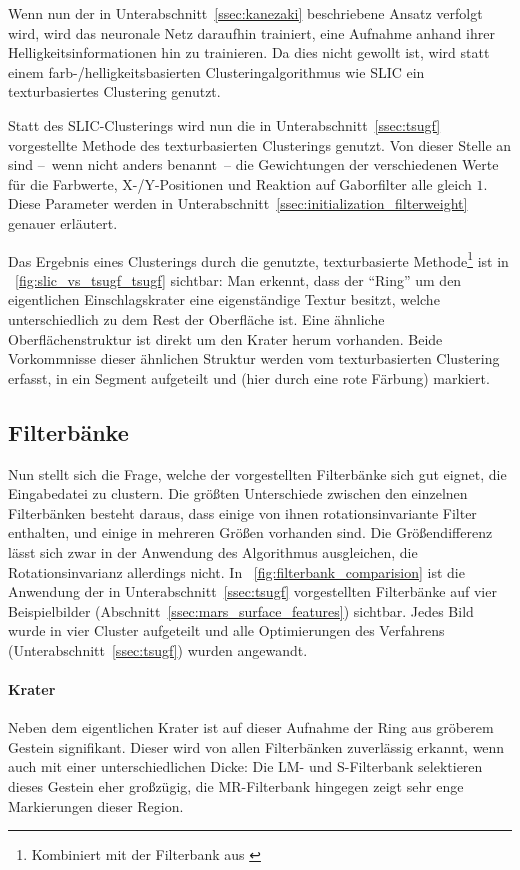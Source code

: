 Wenn nun der in Unterabschnitt~\ref{ssec:kanezaki} beschriebene Ansatz verfolgt wird, wird das neuronale Netz daraufhin trainiert, eine Aufnahme anhand ihrer Helligkeitsinformationen hin zu trainieren. Da dies nicht gewollt ist, wird statt einem farb-/helligkeitsbasierten Clusteringalgorithmus wie SLIC ein texturbasiertes Clustering genutzt.

Statt des SLIC-Clusterings wird nun die in Unterabschnitt~\ref{ssec:tsugf} vorgestellte Methode des texturbasierten Clusterings genutzt. Von dieser Stelle an sind --~wenn nicht anders benannt~-- die Gewichtungen der verschiedenen Werte für die Farbwerte, X-/Y-Positionen und Reaktion auf Gaborfilter alle gleich $1$. Diese Parameter werden in Unterabschnitt~\ref{ssec:initialization_filterweight} genauer erläutert.

Das Ergebnis eines Clusterings durch die genutzte, texturbasierte Methode\footnote{Kombiniert mit der Filterbank aus \cite{jain_91}} ist in \figurename~\ref{fig:slic_vs_tsugf_tsugf} sichtbar: Man erkennt, dass der \enquote{Ring} um den eigentlichen Einschlagskrater eine eigenständige Textur besitzt, welche unterschiedlich zu dem Rest der Oberfläche ist. Eine ähnliche Oberflächenstruktur ist direkt um den Krater herum vorhanden. Beide Vorkommnisse dieser ähnlichen Struktur werden vom texturbasierten Clustering erfasst, in ein Segment aufgeteilt und (hier durch eine rote Färbung) markiert.

\subsection{Filterbänke}
\label{ssec:initialization_filterbanks}
Nun stellt sich die Frage, welche der vorgestellten Filterbänke sich gut eignet, die Eingabedatei zu clustern. Die größten Unterschiede zwischen den einzelnen Filterbänken besteht daraus, dass einige von ihnen rotationsinvariante Filter enthalten, und einige in mehreren Größen vorhanden sind. Die Größendifferenz lässt sich zwar in der Anwendung des Algorithmus ausgleichen, die Rotationsinvarianz allerdings nicht. In \figurename~\ref{fig:filterbank_comparision} ist die Anwendung der in Unterabschnitt~\ref{ssec:tsugf} vorgestellten Filterbänke auf vier Beispielbilder (\vgl Abschnitt~\ref{ssec:mars_surface_features}) sichtbar. Jedes Bild wurde in vier Cluster aufgeteilt und alle Optimierungen des Verfahrens (\vgl Unterabschnitt~\ref{ssec:tsugf}) wurden angewandt.

\paragraph{Krater}
Neben dem eigentlichen Krater ist auf dieser Aufnahme der Ring aus gröberem Gestein signifikant. Dieser wird von allen Filterbänken zuverlässig erkannt, wenn auch mit einer unterschiedlichen Dicke: Die LM- und S-Filterbank selektieren dieses Gestein eher großzügig, die MR-Filterbank hingegen zeigt sehr enge Markierungen dieser Region.


